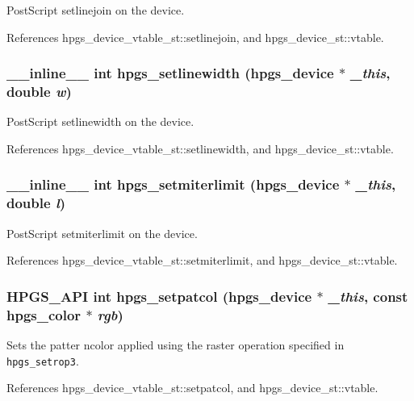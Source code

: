PostScript setlinejoin on the device. 

References hpgs\_\-device\_\-vtable\_\-st::setlinejoin, and hpgs\_\-device\_\-st::vtable.
\subsubsection[hpgs\_\-setlinewidth]{\setlength{\rightskip}{0pt plus 5cm}\_\-\_\-inline\_\-\_\- int hpgs\_\-setlinewidth ({\bf hpgs\_\-device} $\ast$ {\em \_\-this}, \/  double {\em w})\hspace{0.3cm}{\tt  [static]}}\label{group__device_gdf3395c8e59649dc075d1b4f0d938124}


PostScript setlinewidth on the device. 

References hpgs\_\-device\_\-vtable\_\-st::setlinewidth, and hpgs\_\-device\_\-st::vtable.
\subsubsection[hpgs\_\-setmiterlimit]{\setlength{\rightskip}{0pt plus 5cm}\_\-\_\-inline\_\-\_\- int hpgs\_\-setmiterlimit ({\bf hpgs\_\-device} $\ast$ {\em \_\-this}, \/  double {\em l})\hspace{0.3cm}{\tt  [static]}}\label{group__device_g653c3d98e3aa5167ff96f53729e73e1b}


PostScript setmiterlimit on the device. 

References hpgs\_\-device\_\-vtable\_\-st::setmiterlimit, and hpgs\_\-device\_\-st::vtable.
\subsubsection[hpgs\_\-setpatcol]{\setlength{\rightskip}{0pt plus 5cm}HPGS\_\-API int hpgs\_\-setpatcol ({\bf hpgs\_\-device} $\ast$ {\em \_\-this}, \/  const {\bf hpgs\_\-color} $\ast$ {\em rgb})}\label{group__device_g241c4383528e55adbbb1841d7d8ca2b3}


Sets the patter ncolor applied using the raster operation specified in {\tt hpgs\_\-setrop3}. 

References hpgs\_\-device\_\-vtable\_\-st::setpatcol, and hpgs\_\-device\_\-st::vtable.

